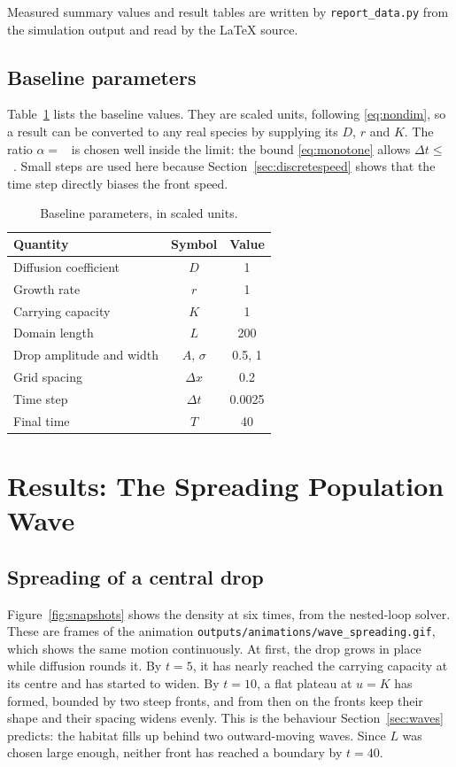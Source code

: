 \documentclass[11pt,a4paper]{article}
\newcommand{\code}[1]{\texttt{\small #1}}
\begin{document}
Measured summary values and result tables are written by \code{report\_data.py} from the
simulation output and read by the LaTeX source.

\subsection{Baseline parameters}
Table~\ref{tab:params} lists the baseline values. They are scaled units, following
\eqref{eq:nondim}, so a result can be converted to any real species by supplying its $D$, $r$ and $K$.
The ratio $\alpha=$~\resBaseAlpha{} is chosen well inside the limit: the bound \eqref{eq:monotone} allows
$\Delta t\le$~\resBaseDtLimit{}. Small steps are used here because Section~\ref{sec:discretespeed} shows that
the time step directly biases the front speed.

\begin{table}[H]
\centering\small
\caption{Baseline parameters, in scaled units.}
\label{tab:params}
\begin{tabular}{lcc}
\toprule
Quantity & Symbol & Value\\
\midrule
Diffusion coefficient & $D$ & 1\\
Growth rate & $r$ & 1\\
Carrying capacity & $K$ & 1\\
Domain length & $L$ & 200\\
Drop amplitude and width & $A$, $\sigma$ & 0.5, 1\\
Grid spacing & $\Delta x$ & 0.2\\
Time step & $\Delta t$ & 0.0025\\
Final time & $T$ & 40\\
\bottomrule
\end{tabular}
\end{table}

\section{Results: The Spreading Population Wave}\label{sec:results}

\subsection{Spreading of a central drop}
Figure~\ref{fig:snapshots} shows the density at six times, from the nested-loop solver. These are
frames of the animation \code{outputs/animations/wave\_spreading.gif}, which shows the same motion
continuously. At first, the drop grows in place while diffusion rounds it. By $t=5$, it has nearly
reached the carrying capacity at its centre and has started to widen. By $t=10$, a flat plateau at
$u=K$ has formed, bounded by two steep fronts, and from then on the fronts keep their shape and
their spacing widens evenly. This is the behaviour Section~\ref{sec:waves} predicts: the habitat
fills up behind two outward-moving waves. Since $L$ was chosen large enough, neither front has
reached a boundary by $t=40$.
\end{document}
